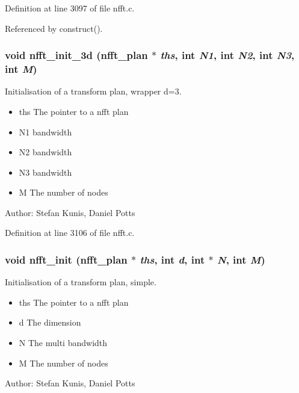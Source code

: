 Definition at line 3097 of file nfft.c.

Referenced by construct().\hypertarget{group__nfft_g67493342a23bdbb4301063f96e13fd88}{
\subsubsection{\setlength{\rightskip}{0pt plus 5cm}void nfft\_\-init\_\-3d ({\bf nfft\_\-plan} $\ast$ {\em ths}, int {\em N1}, int {\em N2}, int {\em N3}, int {\em M})}}
\label{group__nfft_g67493342a23bdbb4301063f96e13fd88}


Initialisation of a transform plan, wrapper d=3. 

\begin{itemize}
\item ths The pointer to a nfft plan \item N1 bandwidth \item N2 bandwidth \item N3 bandwidth \item M The number of nodes\end{itemize}
\begin{Desc}
\item[Author:]Stefan Kunis, Daniel Potts \end{Desc}


Definition at line 3106 of file nfft.c.\hypertarget{group__nfft_g1dfeaf18f3735f035afa62ca768d99c4}{
\subsubsection{\setlength{\rightskip}{0pt plus 5cm}void nfft\_\-init ({\bf nfft\_\-plan} $\ast$ {\em ths}, int {\em d}, int $\ast$ {\em N}, int {\em M})}}
\label{group__nfft_g1dfeaf18f3735f035afa62ca768d99c4}


Initialisation of a transform plan, simple. 

\begin{itemize}
\item ths The pointer to a nfft plan \item d The dimension \item N The multi bandwidth \item M The number of nodes\end{itemize}
\begin{Desc}
\item[Author:]Stefan Kunis, Daniel Potts \end{Desc}


